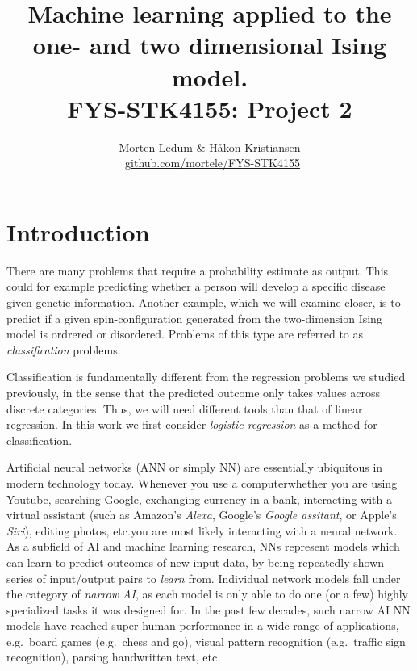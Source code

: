 \documentclass[a4paper, twocolumn]{article}
\title{{\sc Machine learning applied to the one- and two dimensional Ising model. \\ {\large FYS-STK4155: Project 2}}}
\author{Morten Ledum \& Håkon Kristiansen \\ \faGithub \ {\small \href{https://github.com/mortele/FYS-STK4155/tree/master/project2}{github.com/mortele/FYS-STK4155}}}
\begin{document}
\onecolumn
\maketitle

\begin{abstract}

\end{abstract}

\tableofcontents 

\twocolumn


\section{Introduction}
There are many problems that require a probability estimate as output. This could for example predicting whether a person will develop a specific disease given genetic information. Another example, which we will examine closer, is to predict if a given spin-configuration generated from the two-dimension Ising model is ordrered or disordered. Problems of this type are referred to as \textit{classification} problems. 

Classification is fundamentally different from the regression problems we studied previously, in the sense that the predicted outcome only takes values across discrete categories.  Thus, we will need different tools than that of linear regression. In this work we first consider \textit{logistic regression} as a method for classification. 

Artificial neural networks (ANN or simply NN) are essentially ubiquitous in modern technology today. Whenever you use a computer\textemdash whether you are using Youtube, searching Google, exchanging currency in a bank, interacting with a virtual assistant (such as Amazon's \textit{Alexa}, Google's \textit{Google assitant}, or Apple's \textit{Siri}), editing photos, etc.\textemdash you are most likely interacting with a neural network. As a subfield of AI and machine learning research, NNs represent models which can learn to predict outcomes of new input data, by being repeatedly shown series of input/output pairs to \textit{learn} from. Individual network models fall under the category of \textit{narrow AI}, as each model is only able to do one (or a few) highly specialized tasks it was designed for. In the past few decades, such narrow AI NN models have reached super-human performance in a wide range of applications, e.g.\ board games (e.g.\ chess and go), visual pattern recognition (e.g.\ traffic sign recognition), parsing handwritten text, etc.
\end{document}
